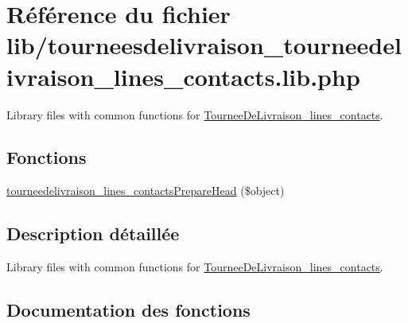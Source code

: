 \hypertarget{tourneesdelivraison__tourneedelivraison__lines__contacts_8lib_8php}{}\section{Référence du fichier lib/tourneesdelivraison\+\_\+tourneedelivraison\+\_\+lines\+\_\+contacts.lib.\+php}
\label{tourneesdelivraison__tourneedelivraison__lines__contacts_8lib_8php}


Library files with common functions for \hyperlink{classTourneeDeLivraison__lines__contacts}{Tournee\+De\+Livraison\+\_\+lines\+\_\+contacts}.  


\subsection*{Fonctions}
\begin{DoxyCompactItemize}
\item 
\hyperlink{tourneesdelivraison__tourneedelivraison__lines__contacts_8lib_8php_aca203c9056bcfe4cc3e45d0af2b355f8}{tourneedelivraison\+\_\+lines\+\_\+contacts\+Prepare\+Head} (\$object)
\end{DoxyCompactItemize}


\subsection{Description détaillée}
Library files with common functions for \hyperlink{classTourneeDeLivraison__lines__contacts}{Tournee\+De\+Livraison\+\_\+lines\+\_\+contacts}. 



\subsection{Documentation des fonctions}
\mbox{\label{tourneesdelivraison__tourneedelivraison__lines__contacts_8lib_8php_aca203c9056bcfe4cc3e45d0af2b355f8}} 
